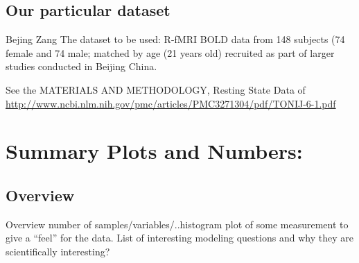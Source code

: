 \documentclass[bigger]{beamer}
\begin{document}
\subsection{Our particular dataset}
\label{sec-1-3}
\begin{frame}[label=sec-1-3-1]{Bejing Zang}
The dataset to be used: R-fMRI BOLD data from 148 subjects (74 female and 74
male; matched by age (21 years old) recruited as part of
larger studies conducted in Beijing China.

See the MATERIALS AND METHODOLOGY, Resting State Data of  
\url{http://www.ncbi.nlm.nih.gov/pmc/articles/PMC3271304/pdf/TONIJ-6-1.pdf}
\end{frame}


\section{Summary Plots and Numbers:}
\label{sec-2}
\subsection{Overview}
\label{sec-2-1}
\begin{frame}[label=sec-2-1-1]{Overview}
number of samples/variables/..histogram plot of some measurement 
to give a ``feel'' for the data. List of interesting modeling questions 
and why they are scientifically interesting?        
\end{frame}
\end{document}
